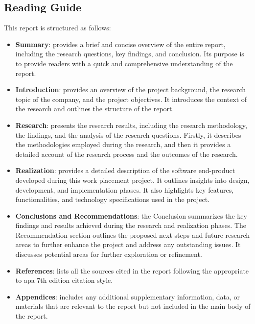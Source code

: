 \begin{multicols}{2}
      \section{Reading Guide}
      This report is structured as follows:
      \begin{itemize}
            \item \textbf{Summary}: provides a brief and concise overview of the entire report, including the
                  research questions, key findings, and conclusion. Its purpose is to provide readers with a
                  quick and comprehensive understanding of the report.
            \item \textbf{Introduction}: provides an overview of the project background, the research topic of the
                  company, and the project objectives. It introduces the context of the research and outlines the
                  structure of the report.
            \item \textbf{Research}: presents the research results, including the research methodology, the findings,
                  and the analysis of the research questions. Firstly, it describes the methodologies employed
                  during the research, and then it provides a detailed account of the research process and the
                  outcomes of the research.
            \item \textbf{Realization}: provides a detailed description of the software end-product developed during
                  this work placement project. It outlines insights into design, development, and implementation
                  phases. It also highlights key features, functionalities, and technology specifications used in
                  the project.
            \item \textbf{Conclusions and Recommendations}: the Conclusion summarizes the key findings and results
                  achieved during the research and realization phases. The Recommendation section outlines the
                  proposed next steps and future research areas to further enhance the project and address any
                  outstanding issues. It discusses potential areas for further exploration or refinement.
            \item \textbf{References}: lists all the sources cited in the report following the appropriate to
                  \acrshort{apa} 7th edition citation style.
            \item \textbf{Appendices}: includes any additional supplementary information, data, or materials that
                  are relevant to the report but not included in the main body of the report.
      \end{itemize}
\end{multicols}